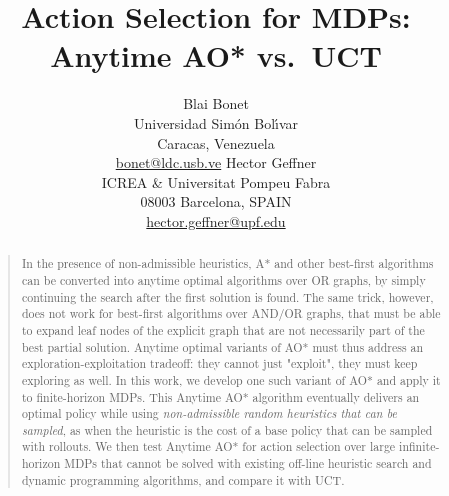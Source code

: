 \documentclass[letterpaper]{article}
\begin{document}
%
\title{Action Selection for MDPs: Anytime AO* vs.\ UCT}

\author{Blai Bonet \\
        Universidad Sim\'on Bol\'{\i}var \\
        Caracas, Venezuela \\
        {\normalsize\url{bonet@ldc.usb.ve}}
\And
        Hector Geffner \\
        ICREA \&  Universitat Pompeu Fabra \\
        08003  Barcelona, SPAIN \\
        {\normalsize\url{hector.geffner@upf.edu}}}


\maketitle
\begin{abstract}
\begin{quote}
In the presence of non-admissible heuristics, A* and other best-first algorithms
can be  converted into anytime optimal algorithms over OR graphs, by simply continuing
the search after the first solution is found. The same trick, however, does not work
for  best-first algorithms over AND/OR graphs, that must be able to expand leaf nodes of
the explicit graph that are not necessarily part of the best partial solution.
Anytime optimal variants of AO* must thus address an exploration-exploitation tradeoff:
they cannot just "exploit", they must keep exploring as well. In this work,
we develop one such variant of AO* and apply it to finite-horizon MDPs.
This Anytime AO* algorithm eventually delivers an optimal policy  while using
\emph{non-admissible random heuristics that can be sampled}, as when the heuristic
is the cost of a base policy that can be sampled with rollouts.
We then test Anytime AO* for action selection
over large infinite-horizon MDPs that cannot be solved with existing off-line
heuristic search and dynamic programming algorithms, and compare it with UCT.
\end{quote}
\end{abstract}
\end{document}

